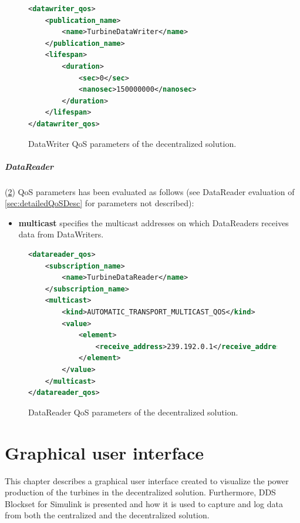 \begin{figure}[!h]
\begin{lstlisting}[language=XML]
<datawriter_qos>
	<publication_name>
		<name>TurbineDataWriter</name>
	</publication_name>
	<lifespan>
		<duration>
			<sec>0</sec>
			<nanosec>150000000</nanosec>
		</duration>
	</lifespan>
</datawriter_qos>
\end{lstlisting}
\caption[Decentralized DataWriter QoS parameters]{
		\label{fig:decDataWriterQos} 
		\footnotesize{DataWriter QoS parameters of the decentralized solution.}
	}
\end{figure}

\paragraph{DataReader} (\cref{fig:decDataReaderQos}) QoS parameters has been evaluated as follows (see DataReader evaluation of \cref{sec:detailedQoSDesc} for parameters not described):

\begin{itemize}
	\item \textbf{multicast} specifies the multicast addresses on which DataReaders receives data from DataWriters. 
\end{itemize}

\begin{figure}[!h]
\begin{lstlisting}[language=XML]
<datareader_qos>
	<subscription_name>
		<name>TurbineDataReader</name>
	</subscription_name>
	<multicast>
		<kind>AUTOMATIC_TRANSPORT_MULTICAST_QOS</kind>
		<value>
			<element>
				<receive_address>239.192.0.1</receive_address>
			</element>
		</value>
	</multicast>
</datareader_qos>
\end{lstlisting}
\caption[Decentralized DataReader QoS parameters]{
		\label{fig:decDataReaderQos} 
		\footnotesize{DataReader QoS parameters of the decentralized solution.}
	}
\end{figure}

\chapter{Graphical user interface} \label{sec:graphicalInterface}
This chapter describes a graphical user interface created to visualize the power production of the turbines in the decentralized solution. Furthermore, DDS Blockset for Simulink is presented and how it is used to capture and log data from both the centralized and the decentralized solution.

